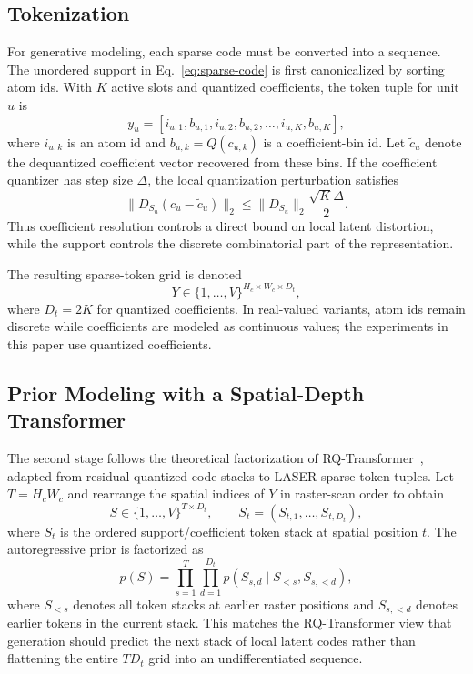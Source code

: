 \documentclass[10pt]{article}
\begin{document}
\subsection{Tokenization}

For generative modeling, each sparse code must be converted into a sequence. The unordered support in Eq.~\ref{eq:sparse-code} is first canonicalized by sorting atom ids. With $K$ active slots and quantized coefficients, the token tuple for unit $u$ is
\begin{equation}
    y_u =
    [i_{u,1}, b_{u,1}, i_{u,2}, b_{u,2}, \ldots, i_{u,K}, b_{u,K}],
    \label{eq:sparse-token}
\end{equation}
where $i_{u,k}$ is an atom id and $b_{u,k}=Q(c_{u,k})$ is a coefficient-bin id. Let $\tilde{c}_u$ denote the dequantized coefficient vector recovered from these bins. If the coefficient quantizer has step size $\Delta$, the local quantization perturbation satisfies
\begin{equation}
    \|D_{S_u}(c_u-\tilde{c}_u)\|_2
    \le
    \|D_{S_u}\|_2 \frac{\sqrt{K}\Delta}{2}.
\end{equation}
Thus coefficient resolution controls a direct bound on local latent distortion, while the support controls the discrete combinatorial part of the representation.

The resulting sparse-token grid is denoted
\begin{equation}
    Y \in \{1,\ldots,V\}^{H_c \times W_c \times D_t},
\end{equation}
where $D_t=2K$ for quantized coefficients. In real-valued variants, atom ids remain discrete while coefficients are modeled as continuous values; the experiments in this paper use quantized coefficients.

\subsection{Prior Modeling with a Spatial-Depth Transformer}

The second stage follows the theoretical factorization of RQ-Transformer~\citep{lee2022rqvae}, adapted from residual-quantized code stacks to LASER sparse-token tuples. Let $T=H_cW_c$ and rearrange the spatial indices of $Y$ in raster-scan order to obtain
\begin{equation}
    S \in \{1,\ldots,V\}^{T \times D_t},
    \qquad
    S_t=(S_{t,1},\ldots,S_{t,D_t}),
\end{equation}
where $S_t$ is the ordered support/coefficient token stack at spatial position $t$. The autoregressive prior is factorized as
\begin{equation}
    p(S)
    =
    \prod_{s=1}^{T}
    \prod_{d=1}^{D_t}
    p(S_{s,d} \mid S_{<s}, S_{s,<d}),
    \label{eq:spatial-depth}
\end{equation}
where $S_{<s}$ denotes all token stacks at earlier raster positions and $S_{s,<d}$ denotes earlier tokens in the current stack. This matches the RQ-Transformer view that generation should predict the next stack of local latent codes rather than flattening the entire $T D_t$ grid into an undifferentiated sequence.
\end{document}

